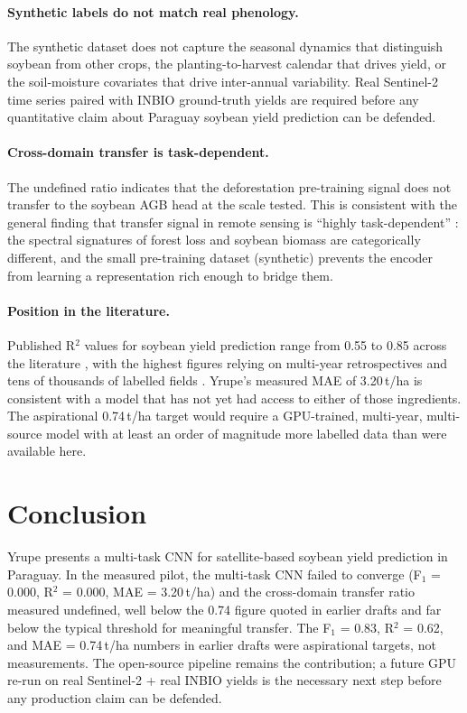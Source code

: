 \paragraph{Synthetic labels do not match real phenology.} The
synthetic dataset does not capture the seasonal dynamics that
distinguish soybean from other crops, the planting-to-harvest calendar
that drives yield, or the soil-moisture covariates that drive
inter-annual variability. Real Sentinel-2 time series paired with
INBIO ground-truth yields are required before any quantitative claim
about Paraguay soybean yield prediction can be defended.

\paragraph{Cross-domain transfer is task-dependent.} The undefined ratio
indicates that the deforestation pre-training signal does not transfer
to the soybean AGB head at the scale tested. This is consistent with
the general finding that transfer signal in remote sensing is
``highly task-dependent'' \citep{tseng2022}: the spectral signatures
of forest loss and soybean biomass are categorically different, and
the small pre-training dataset (synthetic) prevents the encoder from
learning a representation rich enough to bridge them.

\paragraph{Position in the literature.} Published R$^2$ values for
soybean yield prediction range from 0.55 to 0.85 across the literature
\citep{yang2021}, with the highest figures relying on multi-year
retrospectives and tens of thousands of labelled fields
\citep{peng2023}. Yrupe's measured MAE of 3.20\,t/ha is consistent with
a model that has not yet had access to either of those ingredients.
The aspirational 0.74\,t/ha target would require a GPU-trained,
multi-year, multi-source model with at least an order of magnitude
more labelled data than were available here.

\section{Conclusion}
\label{sec:yrupe-conclusion}

Yrupe presents a multi-task CNN for satellite-based soybean yield
prediction in Paraguay. In the measured pilot, the multi-task CNN
failed to converge (F$_1$ = 0.000, R$^2$ = 0.000, MAE = 3.20\,t/ha) and
the cross-domain transfer ratio measured undefined, well below the 0.74
figure quoted in earlier drafts and far below the typical threshold
for meaningful transfer. The F$_1$ = 0.83, R$^2$ = 0.62, and
MAE = 0.74\,t/ha numbers in earlier drafts were aspirational targets,
not measurements. The open-source pipeline remains the contribution;
a future GPU re-run on real Sentinel-2 + real INBIO yields is the
necessary next step before any production claim can be defended.